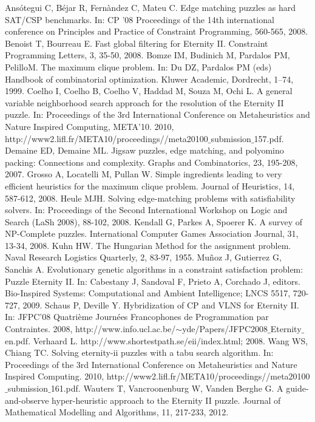 \documentclass[preprint,12pt]{elsarticle}
\begin{document}

\begin{thebibliography}{00}


 Ans\'otegui C, B\'ejar R, Fern\`{a}ndez C, Mateu C. Edge matching puzzles
as hard SAT/CSP benchmarks. In: CP '08 Proceedings of the 14th
international conference on Principles and Practice of Constraint Programming, 560-565, 2008.
 Benoist T, Bourreau E. Fast global filtering for Eternity II. Constraint
Programming Letters, 3, 35-50, 2008.
Bomze IM, Budinich M, Pardalos PM, PelilloM. The maximum clique problem. In: Du DZ, Pardalos
PM (eds) Handbook of combinatorial optimization. Kluwer Academic, Dordrecht, 1–74, 1999.
 Coelho I, Coelho B, Coelho V, Haddad M, Souza M, Ochi L. A general
variable neighborhood search approach for the resolution of the
Eternity II puzzle. In: Proceedings of the 3rd International Conference
on Metaheuristics and Nature Inspired Computing, META'10. 2010, 
http://www2.lifl.fr/META10/proceedings//meta20100$\_$submission$\_$157.pdf.
 Demaine ED, Demaine ML. Jigsaw puzzles, edge matching, and polyomino
packing: Connections and complexity. Graphs and Combinatorics, 23, 195-208, 2007.
 Grosso A, Locatelli M, Pullan W. Simple ingredients leading to very efficient heuristics for the maximum clique problem. Journal of Heuristics, 14, 587-612, 2008.
 Heule MJH. Solving edge-matching problems with satisfiability solvers.
In: Proceedings of the Second International Workshop on Logic and
Search (LaSh 2008), 88-102, 2008.
 Kendall G, Parkes A, Spoerer K. A survey of NP-Complete puzzles.
International Computer Games Association Journal, 31, 13-34, 2008.
 Kuhn HW. The Hungarian Method for the assignment problem. Naval
Research Logistics Quarterly, 2, 83-97, 1955.
 Mu\~noz J, Gutierrez G, Sanchis A. Evolutionary genetic algorithms in
a constraint satisfaction problem: Puzzle Eternity II. In: Cabestany
J, Sandoval F, Prieto A, Corchado J, editors. Bio-Inspired Systems:
Computational and Ambient Intelligence; LNCS 5517, 720-727,  2009.
 Schaus P, Deville Y. Hybridization of CP and VLNS for Eternity II.
In: JFPC'08 Quatri\`{e}me Journ\'ees Francophones de Programmation par
Contraintes. 2008, http://www.info.ucl.ac.be/$\sim$yde/Papers/JFPC2008$\_$Eternity$\_$en.pdf.
 Verhaard L. http://www.shortestpath.se/eii/index.html; 2008.
 Wang WS, Chiang TC. Solving eternity-ii puzzles with a tabu search
algorithm. In: Proceedings of the 3rd International Conference on Metaheuristics
and Nature Inspired Computing. 2010, 
http://www2.lifl.fr/META10/proceedings//meta20100$\_$submission$\_$161.pdf.
 Wauters T, Vancroonenburg W, Vanden Berghe G. A guide-and-observe
hyper-heuristic approach to the Eternity II puzzle. Journal of Mathematical
Modelling and Algorithms, 11, 217-233, 2012.
\end{thebibliography}
\end{document}
